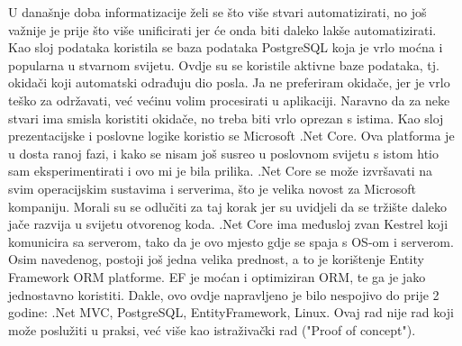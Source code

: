 \documentclass[a4paper,12pt]{foi}
\begin{document}
U današnje doba informatizacije želi se što više stvari automatizirati, no još važnije je prije što više unificirati jer će onda biti daleko lakše automatizirati. Kao sloj podataka koristila se baza podataka PostgreSQL koja je vrlo moćna i popularna u stvarnom svijetu. Ovdje su se koristile aktivne baze podataka, tj. okidači koji automatski odrađuju dio posla. Ja ne preferiram okidače, jer je vrlo teško za održavati, već većinu volim procesirati u aplikaciji. Naravno da za neke stvari ima smisla koristiti okidače, no treba biti vrlo oprezan s istima. Kao sloj prezentacijske i poslovne logike koristio se Microsoft .Net Core. Ova platforma je u dosta ranoj fazi, i kako se nisam još susreo u poslovnom svijetu s istom htio sam eksperimentirati i ovo mi je bila prilika. .Net Core se može izvršavati na svim operacijskim sustavima i serverima, što je velika novost za Microsoft kompaniju. Morali su se odlučiti za taj korak jer su uvidjeli da se tržište daleko jače razvija u svijetu otvorenog koda. .Net Core ima međusloj zvan Kestrel koji komunicira sa serverom, tako da je ovo mjesto gdje se spaja s OS-om i serverom. Osim navedenog, postoji još jedna velika prednost, a to je korištenje Entity Framework ORM platforme. EF je moćan i optimiziran ORM, te ga je jako jednostavno koristiti. Dakle, ovo ovdje napravljeno je bilo nespojivo do prije 2 godine: .Net MVC, PostgreSQL, EntityFramework, Linux. Ovaj rad nije rad koji može poslužiti u praksi, već više kao istraživački rad ("Proof of concept").



\end{document}
